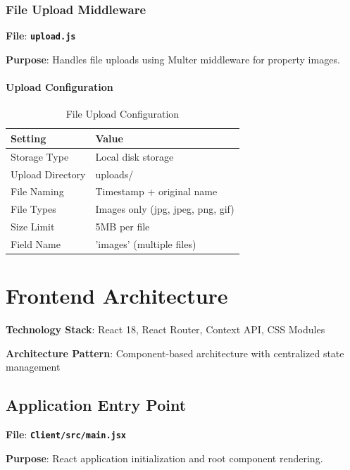 \documentclass[12pt,a4paper]{article}
\newcommand{\file}[1]{\textbf{\texttt{#1}}}
\begin{document}
\subsubsection{File Upload Middleware}
\label{subsubsec:upload-middleware}

\textbf{File}: \file{upload.js}

\textbf{Purpose}: Handles file uploads using Multer middleware for property images.

\paragraph{Upload Configuration}
\begin{table}[H]
\centering
\small
\begin{tabular}{@{}ll@{}}
\toprule
\textbf{Setting} & \textbf{Value} \\
\midrule
Storage Type & Local disk storage \\
Upload Directory & uploads/ \\
File Naming & Timestamp + original name \\
File Types & Images only (jpg, jpeg, png, gif) \\
Size Limit & 5MB per file \\
Field Name & 'images' (multiple files) \\
\bottomrule
\end{tabular}
\caption{File Upload Configuration}
\label{tab:upload-config}
\end{table}

\section{Frontend Architecture}
\label{sec:frontend-architecture}

\textbf{Technology Stack}: React 18, React Router, Context API, CSS Modules

\textbf{Architecture Pattern}: Component-based architecture with centralized state management

\subsection{Application Entry Point}
\label{subsec:app-entry}

\textbf{File}: \file{Client/src/main.jsx}

\textbf{Purpose}: React application initialization and root component rendering.
\end{document}

